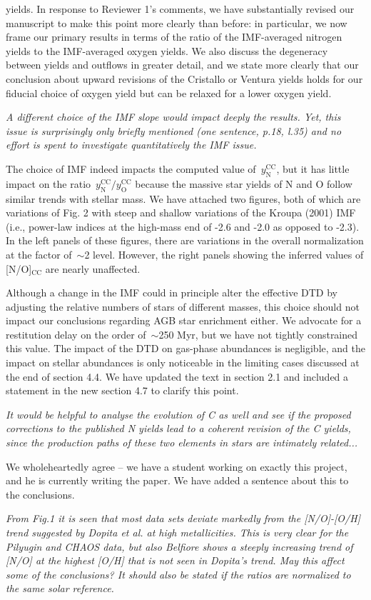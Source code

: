 \documentclass[12pt]{article}
\newcommand{\ycc}[1]{\ensuremath{y_\text{#1}^\text{CC}}}
\newcommand\doublebreak[0]{\par\null\par\noindent}
\begin{document}
yields.
In response to Reviewer 1's comments, we have substantially revised our
manuscript to make this point more clearly than before: in particular, we now
frame our primary results in terms of the ratio of the IMF-averaged nitrogen
yields to the IMF-averaged oxygen yields.
We also discuss the degeneracy between yields and outflows in greater detail,
and we state more clearly that our conclusion about upward revisions of the
Cristallo or Ventura yields holds for our fiducial choice of oxygen yield but
can be relaxed for a lower oxygen yield.
\doublebreak
\textit{%
A different choice of the IMF slope would impact deeply the results.
Yet, this issue is surprisingly only briefly mentioned (one sentence, p.18,
l.35) and no effort is spent to investigate quantitatively the IMF issue.
}
\doublebreak
The choice of IMF indeed impacts the computed value of~$\ycc{N}$, but it has
little impact on the ratio~$\ycc{N} / \ycc{O}$ because the massive star yields
of N and O follow similar trends with stellar mass.
We have attached two figures, both of which are variations of Fig. 2 with
steep and shallow variations of the Kroupa (2001) IMF (i.e., power-law indices
at the high-mass end of -2.6 and -2.0 as opposed to -2.3).
In the left panels of these figures, there are variations in the overall
normalization at the factor of~$\sim$2 level.
However, the right panels showing the inferred values of [N/O]$_\text{CC}$ are
nearly unaffected.
\par
Although a change in the IMF could in principle alter the effective DTD by
adjusting the relative numbers of stars of different masses, this choice should
not impact our conclusions regarding AGB star enrichment either.
We advocate for a restitution delay on the order of~$\sim$250 Myr, but we have
not tightly constrained this value.
The impact of the DTD on gas-phase
abundances is negligible, and the impact on stellar abundances is only
noticeable in the limiting cases discussed at the end of section 4.4.
We have updated the text in section 2.1 and included a statement in the new
section 4.7 to clarify this point.
\doublebreak
\textit{%
It would be helpful to analyse the evolution of C as well and see if the
proposed corrections to the published N yields lead to a coherent revision of
the C yields, since the production paths of these two elements in stars are
intimately related...
}
\doublebreak
We wholeheartedly agree -- we have a student working on exactly this project,
and he is currently writing the paper.
We have added a sentence about this to the conclusions.
\doublebreak
\textit{%
From Fig.1 it is seen that most data sets deviate markedly from the [N/O]-[O/H]
trend suggested by Dopita et al. at high metallicities. This is very clear for
the Pilyugin and CHAOS data, but also Belfiore shows a steeply increasing trend
of [N/O] at the highest [O/H] that is not seen in Dopita's trend. May this
affect some of the conclusions? It should also be stated if the ratios are
normalized to the same solar reference.
}
\end{document}
